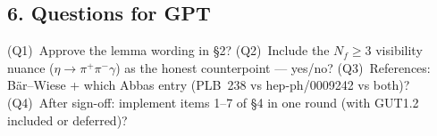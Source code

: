 \subsection*{6. Questions for GPT}
(Q1)~Approve the lemma wording in \S2?
(Q2)~Include the $N_f\ge3$ visibility nuance
($\eta\to\pi^+\pi^-\gamma$) as the honest counterpoint --- yes/no?
(Q3)~References: B\"ar--Wiese + which Abbas entry (PLB~238 vs
hep-ph/0009242 vs both)?
(Q4)~After sign-off: implement items 1--7 of \S4 in one round
(with GUT1.2 included or deferred)?
